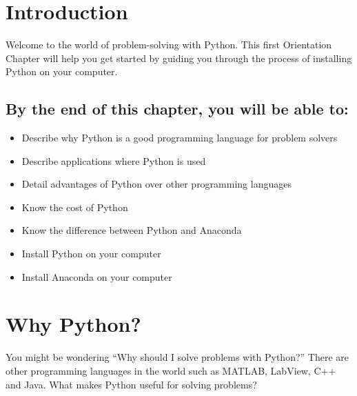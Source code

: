 \documentclass{book}
\begin{document}
    
        \section{Introduction}\label{introduction}
    




    
        Welcome to the world of problem-solving with Python. This first
Orientation Chapter will help you get started by guiding you through the
process of installing Python on your computer.
    




    
        \subsection{By the end of this chapter, you will be able
to:}\label{by-the-end-of-this-chapter-you-will-be-able-to}

\begin{itemize}
\item
  Describe why Python is a good programming language for problem solvers
\item
  Describe applications where Python is used
\item
  Detail advantages of Python over other programming languages
\item
  Know the cost of Python
\item
  Know the difference between Python and Anaconda
\item
  Install Python on your computer
\item
  Install Anaconda on your computer
\end{itemize}
        \newpage



    




    
        \section{Why Python?}\label{why-python}
    




    
        You might be wondering ``Why should I solve problems with Python?''
There are other programming languages in the world such as MATLAB,
LabView, C++ and Java. What makes Python useful for solving problems?
    
\end{document}
